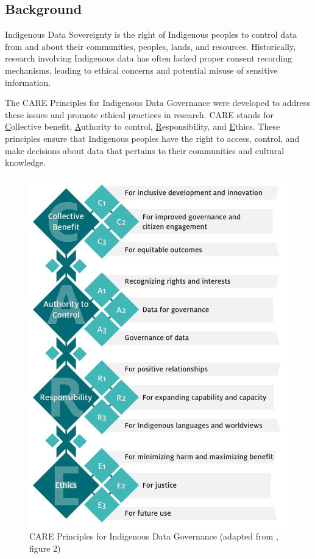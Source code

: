 \documentclass[a0,portrait]{a0poster}
\begin{document}
\setlength{\columnsep}{2cm}
\begin{multicols}{2}

\color{ARDCPink}
\section*{\LARGE Background}
\color{DarkGrey}
\large{
Indigenous Data Sovereignty is the right of Indigenous peoples to control data from and about their communities, peoples, lands, and resources. Historically, research involving Indigenous data has often lacked proper consent recording mechanisms, leading to ethical concerns and potential misuse of sensitive information.

The CARE Principles for Indigenous Data Governance were developed to address these issues and promote ethical practices in research. CARE stands for \underline{C}ollective benefit, \underline{A}uthority to control, \underline{R}esponsibility, and \underline{E}thics. These principles ensure that Indigenous peoples have the right to access, control, and make decisions about data that pertains to their communities and cultural knowledge.

\par
\begin{figure}
\vspace{-1cm}  %
\includegraphics[width=0.43\columnwidth]{figures/CARE-principles.png}
\caption{CARE Principles for Indigenous Data Governance (adapted from \textcite{Carroll2020}, figure 2)}
\vspace{1cm}  %
\end{figure}

}
\end{multicols}
\end{document}
